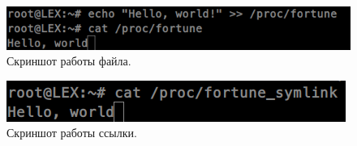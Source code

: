 \begin{figure}[H]
    \centering
    \includegraphics[scale=0.4]{data/image/task_2_4.png}
    \caption{Скриншот работы файла.}
\end{figure}

\begin{figure}[H]
    \centering
    \includegraphics[scale=0.4]{data/image/task_2_cor_2.png}
    \caption{Скриншот работы ссылки.}
\end{figure}
